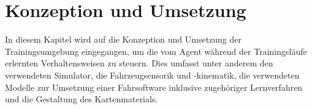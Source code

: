 
\cleardoublepage
\chapter{Konzeption und Umsetzung}\label{ch:Approach}

In diesem Kapitel wird auf die Konzeption und Umsetzung der Trainingsumgebung eingegangen,
um die vom Agent während der Trainingsläufe erlernten Verhaltensweisen zu steuern. Dies umfasst
unter anderem den verwendeten Simulator, die Fahrzeugsensorik und -kinematik, die verwendeten
Modelle zur Umsetzung einer Fahrsoftware inklusive zugehöriger Lernverfahren und die Gestaltung
des Kartenmaterials.






